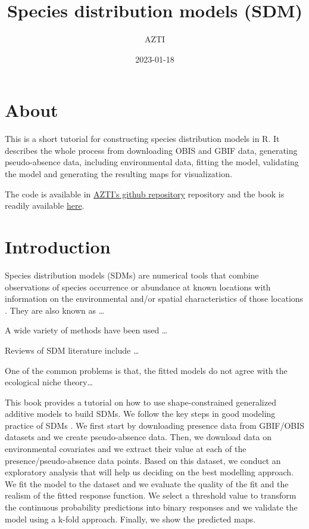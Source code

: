 \documentclass[
]{book}
\title{Species distribution models (SDM)}
\author{AZTI}
\date{2023-01-18}
\begin{document}
\maketitle

{
\setcounter{tocdepth}{1}
\tableofcontents
}
\hypertarget{about}{%
\chapter*{About}\label{about}}

This is a short tutorial for constructing species distribution models in R. It describes the whole process from downloading OBIS and GBIF data, generating pseudo-absence data, including environmental data, fitting the model, validating the model and generating the resulting maps for visualization.

The code is available in \href{https://github.com/Fundacion-AZTI/SDM}{AZTI's github repository} repository and the book is readily available \href{https://fundacion-azti.github.io/SDM/}{here}.

\hypertarget{introduction}{%
\chapter{Introduction}\label{introduction}}

Species distribution models (SDMs) are numerical tools that combine observations of species occurrence or abundance at known locations with information on the environmental and/or spatial characteristics of those locations \citep{elith_etal_2009}. They are also known as \ldots{}

A wide variety of methods have been used \ldots{}

Reviews of SDM literature include \ldots{}

One of the common problems is that, the fitted models do not agree with the ecological niche theory\ldots{}

This book provides a tutorial on how to use shape-constrained generalized additive models to build SDMs. We follow the key steps in good modeling practice of SDMs \citep{elith_etal_2009}. We first start by downloading presence data from GBIF/OBIS datasets and we create pseudo-absence data. Then, we download data on environmental covariates and we extract their value at each of the presence/pseudo-absence data points. Based on this dataset, we conduct an exploratory analysis that will help us deciding on the best modelling approach. We fit the model to the dataset and we evaluate the quality of the fit and the realism of the fitted response function. We select a threshold value to transform the continuous probability predictions into binary responses and we validate the model using a k-fold approach. Finally, we show the predicted maps.
\end{document}

